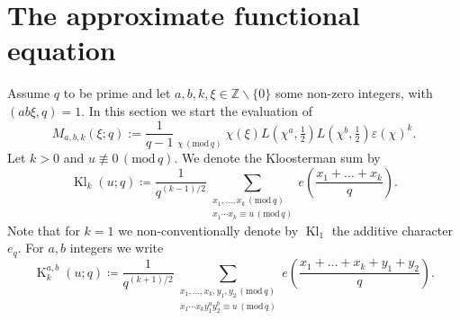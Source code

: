 \documentclass[12pt]{amsart}
\theoremstyle{plain}
\theoremstyle{definition}
\theoremstyle{remark}
\numberwithin{equation}{section}
\newcommand{\ZZ}{\mathbb{Z}}
\newcommand\sumst{\mathop{{\sum}^\ast}\limits}
\newcommand{\mods}[1]{\,(\mathrm{mod}\,{#1})}
\DeclareMathOperator{\Kl}{Kl}%
\DeclareMathOperator{\K}{K} %
\begin{document}
\section{The approximate functional equation}\label{S: AFE, dyadic and PV}
Assume $q$ to be prime and let $a,b,k,\xi\in \ZZ\smallsetminus\{0\}$ some non-zero integers, with $(ab\xi,q) = 1$.  
In this section we start the evaluation of 
\begin{equation}\label{eq: defi Mabk}
    M_{a,b,k}(\xi;q):=\frac{1}{q-1} \sumst_{\chi\mods q}\chi(\xi)L(\chi^a,\tfrac 12)L(\chi^b,\tfrac 12)\varepsilon(\chi)^k.\end{equation}
Let $k>0$ and $ u\not \equiv 0\mods q$. We denote the Kloosterman sum by 
\begin{equation}\label{eq defi Kl_k}
\Kl_k( u;q) \coloneqq \frac{1}{q^{(k-1)/2}}\sum_{\substack{ x_1,\dots, x_k \mods q\\  x_1\cdots  x_k \equiv  u \mods q}}e\left(\frac{ x_1+\dots+ x_k}{q}\right). \end{equation} Note that for $k=1$ we non-conventionally denote by $\Kl_1$ the additive character $e_q$. For $a,b$ integers we write
\begin{equation}\label{eq defi K_k^ab}
    \K_k^{a,b}( u;q) \coloneqq \frac{1}{q^{(k+1)/2}} \sum_{\substack{ x_1,\dots, x_k,y_1,y_2 \mods q\\ x_1\cdots  x_ky_1^a y_2^b \equiv  u \mods q}}e\left(\frac{ x_1+\dots +  x_k+y_1+y_2}{q}\right).  \end{equation}
\end{document}
